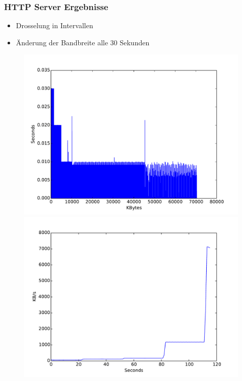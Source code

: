 \documentclass[handout]{beamer}
\begin{document}
\begin{frame}
\frametitle{HTTP Server Ergebnisse}
\begin{itemize}
\item Drosselung in Intervallen
\item Änderung der Bandbreite alle 30 Sekunden
\end{itemize}

\begin{figure}
\centering
\begin{minipage}[t]{0.49\linewidth}
			\centering
			\includegraphics[width=\linewidth]{images/seconds_http.pdf}
\end{minipage}
\begin{minipage}[t]{0.49\linewidth}
			\centering
			\includegraphics[width=\linewidth]{images/datarate_http.pdf}
\end{minipage}
\end{figure}
\end{frame}
\end{document}
